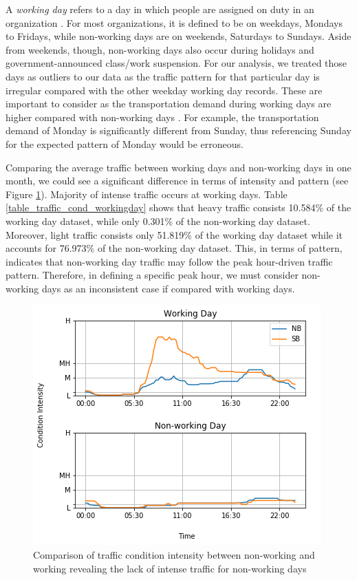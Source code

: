   A \textit{working day} refers to a day in which people are assigned on duty in an organization \cite{liu2008wdcm}. For most organizations, it is defined to be on weekdays, Mondays to Fridays, while non-working days are on weekends, Saturdays to Sundays. Aside from weekends, though, non-working days also occur during holidays and government-announced class/work suspension. For our analysis, we treated those days as outliers to our data as the traffic pattern for that particular day is irregular compared with the other weekday working day records. These are important to consider as the transportation demand during working days are higher compared with non-working days \cite{traffic_trend}. For example, the transportation demand of Monday is significantly different from Sunday, thus referencing Sunday for the expected pattern of Monday would be erroneous.

  Comparing the average traffic between working days and non-working days in one month, we could see a significant difference in terms of intensity and pattern (see Figure \ref{figure_workingday_comparison}). Majority of intense traffic occurs at working days. Table \ref{table_traffic_cond_workingday} shows that heavy traffic consists 10.584\% of the working day dataset, while only 0.301\% of the non-working day dataset. Moreover, light traffic consists only 51.819\% of the working day dataset while it accounts for 76.973\% of the non-working day dataset. This, in terms of pattern, indicates that non-working day traffic may follow the peak hour-driven traffic pattern. Therefore, in defining a specific peak hour, we must consider non-working days as an inconsistent case if compared with working days.
    

\begin{figure}
  \includegraphics[width=\linewidth]{figures/figure_workingday_comparison.png}
  \caption{Comparison of traffic condition intensity between non-working and working revealing the lack of intense traffic for non-working days}
  \label{figure_workingday_comparison}
\end{figure}

